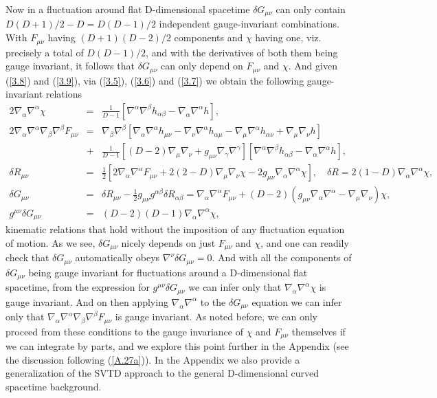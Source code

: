 \documentclass[aps,onecolumn,10pt]{revtex4}
\numberwithin{equation}{section}
\numberwithin{equation}{section}
\begin{document}
Now in a fluctuation around flat D-dimensional spacetime $\delta G_{\mu\nu}$ can only contain $D(D+1)/2-D=D(D-1)/2$ independent gauge-invariant combinations. With $F_{\mu\nu}$ having $(D+1)(D-2)/2$ components and $\chi$ having one, viz. precisely a total of $D(D-1)/2$, and  with the derivatives of both them being gauge invariant, it follows that $\delta G_{\mu\nu}$ can only depend on $F_{\mu\nu}$ and $\chi$. And given (\ref{3.8}) and (\ref{3.9}), via (\ref{3.5}), (\ref{3.6}) and (\ref{3.7}) we obtain  the following gauge-invariant relations
%
\begin{eqnarray}
2\nabla_{\alpha}\nabla^{\alpha}\chi&=&\frac{1}{D-1}\left[\nabla^{\alpha}\nabla^{\beta}h_{\alpha\beta}-\nabla_{\alpha}\nabla^{\alpha}h\right],
\nonumber\\
2\nabla_{\alpha}\nabla^{\alpha}\nabla_{\beta}\nabla^{\beta}F_{\mu\nu}&=&\nabla_{\beta}\nabla^{\beta}\left[\nabla_{\alpha}\nabla^{\alpha}h_{\mu\nu}-\nabla_{\nu}\nabla^{\alpha}h_{\alpha\mu}-\nabla_{\mu}\nabla^{\alpha}h_{\alpha\nu}+\nabla_{\mu}\nabla_{\nu}h\right]
\nonumber\\
&+&\frac{1}{D-1}\left[(D-2)\nabla_{\mu}\nabla_{\nu}+g_{\mu\nu}\nabla_{\gamma}\nabla^{\gamma}\right][\nabla^{\alpha}\nabla^{\beta}h_{\alpha\beta}-\nabla_{\alpha}\nabla^{\alpha}h],
\nonumber\\
\delta R_{\mu\nu}&=&\frac{1}{2}[2\nabla_{\alpha}\nabla^{\alpha}F_{\mu\nu}+2(2-D)\nabla_{\mu}\nabla_{\nu}\chi-2g_{\mu\nu}\nabla_{\alpha}\nabla^{\alpha}\chi], \quad \delta R=2(1-D)\nabla_{\alpha}\nabla^{\alpha}\chi,
\nonumber\\
\delta G_{\mu\nu}&=&\delta R_{\mu\nu}-\frac{1}{2}g_{\mu\nu}g^{\alpha\beta}\delta R_{\alpha\beta}=\nabla_{\alpha}\nabla^{\alpha}F_{\mu\nu}+(D-2)(g_{\mu\nu}\nabla_{\alpha}\nabla^{\alpha}-\nabla_{\mu}\nabla_{\nu})\chi,
\nonumber\\
g^{\mu\nu}\delta G_{\mu\nu}&=&(D-2)(D-1)\nabla_{\alpha}\nabla^{\alpha}\chi,
\label{3.10}
\end{eqnarray}
%
kinematic relations that hold without the imposition of any fluctuation equation of motion. As we see, $\delta G_{\mu\nu}$ nicely depends  on just $F_{\mu\nu}$ and $\chi$, and one can readily check that $\delta G_{\mu\nu}$ automatically obeys $\nabla^{\nu}\delta G_{\mu\nu}=0$.  And with all the components of $\delta G_{\mu\nu}$ being gauge invariant for fluctuations around a D-dimensional flat spacetime,  from the expression for $g^{\mu\nu}\delta G_{\mu\nu}$  we can infer only that $\nabla_{\alpha}\nabla^{\alpha}\chi$ is gauge invariant. And on then applying $\nabla_{\alpha}\nabla^{\alpha}$ to the $\delta G_{\mu\nu}$ equation we can infer only that $\nabla_{\alpha}\nabla^{\alpha}\nabla_{\beta}\nabla^{\beta}F_{\mu\nu}$ is gauge invariant. As noted before, we can only proceed from these conditions to the gauge invariance of $\chi$ and $F_{\mu\nu}$ themselves if we can integrate by parts, and we explore this point further in the Appendix (see the discussion following (\ref{A.27a})). In the Appendix we also provide a generalization of the SVTD approach to the general D-dimensional curved spacetime background.
\end{document}
